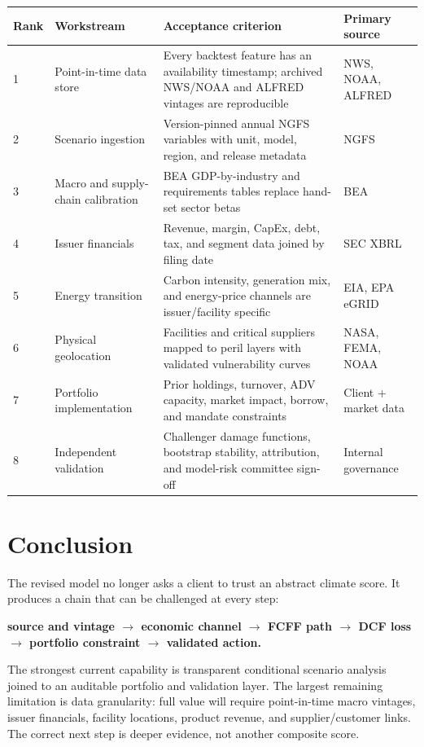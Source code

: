 \documentclass[10pt]{article}
\begin{document}
\begin{longtable}{p{0.40in}p{1.25in}p{3.25in}p{1.25in}}
\toprule
Rank & Workstream & Acceptance criterion & Primary source \\
\midrule
\endhead
1 & Point-in-time data store & Every backtest feature has an availability timestamp; archived NWS/NOAA and ALFRED vintages are reproducible & NWS, NOAA, ALFRED \\
2 & Scenario ingestion & Version-pinned annual NGFS variables with unit, model, region, and release metadata & NGFS \\
3 & Macro and supply-chain calibration & BEA GDP-by-industry and requirements tables replace hand-set sector betas & BEA \\
4 & Issuer financials & Revenue, margin, CapEx, debt, tax, and segment data joined by filing date & SEC XBRL \\
5 & Energy transition & Carbon intensity, generation mix, and energy-price channels are issuer/facility specific & EIA, EPA eGRID \\
6 & Physical geolocation & Facilities and critical suppliers mapped to peril layers with validated vulnerability curves & NASA, FEMA, NOAA \\
7 & Portfolio implementation & Prior holdings, turnover, ADV capacity, market impact, borrow, and mandate constraints & Client + market data \\
8 & Independent validation & Challenger damage functions, bootstrap stability, attribution, and model-risk committee sign-off & Internal governance \\
\bottomrule
\end{longtable}

\section{Conclusion}

The revised model no longer asks a client to trust an abstract climate score. It produces a chain that can be challenged at every step:
\begin{center}
\textbf{source and vintage $\rightarrow$ economic channel $\rightarrow$ FCFF path $\rightarrow$ DCF loss $\rightarrow$ portfolio constraint $\rightarrow$ validated action.}
\end{center}

The strongest current capability is transparent conditional scenario analysis joined to an auditable portfolio and validation layer. The largest remaining limitation is data granularity: full value will require point-in-time macro vintages, issuer financials, facility locations, product revenue, and supplier/customer links. The correct next step is deeper evidence, not another composite score.
\end{document}
